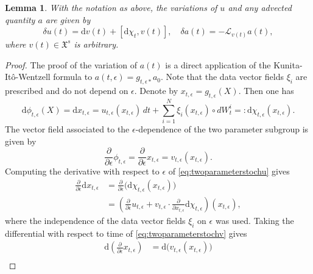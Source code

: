 \documentclass[11pt, oneside]{article}   	%
\numberwithin{equation}{section}
\theoremstyle{plain}
\newtheorem{lemma}[theorem]{Lemma}
\theoremstyle{definition}
\theoremstyle{remark}
\newcommand{\<}{\langle}
\renewcommand{\>}{\rangle}
\def\rmd{{\mathrm{d}}}
\begin{document}
\begin{lemma}
With the notation as above, the variations of $u$ and any advected quantity $a$ are given by 
\begin{equation}
\delta u(t) = {\rmd}v(t) + [{\rmd}\chi_t,v(t)],\quad \delta a(t) = -\mathcal{L}_{v(t)}a(t),
\label{def:delta-var}
\end{equation}
where $v(t)\in\mathfrak{X}^s$ is arbitrary.
 
\end{lemma}
\begin{proof}
The proof of the variation of $a(t)$ is a direct application of the Kunita-It\^o-Wentzell formula to $a(t,\epsilon)=g_{t,\epsilon*}a_0$. Note that the data vector fields $\xi_i$ are prescribed and do not depend on $\epsilon$. Denote by $x_{t,\epsilon} = g_{t,\epsilon}(X)$. Then one has
\begin{equation}
{\rmd}\phi_{t,\epsilon}(X) = {\rmd}x_{t,\epsilon} = u_{t,\epsilon}(x_{t,\epsilon})\,dt + \sum_{i=1}^N \xi_i(x_{t,\epsilon})\circ dW_t^i =: {\rmd}\chi_{t,\epsilon}(x_{t,\epsilon}).
\label{eq:twoparameterstochu}
\end{equation}
The vector field associated to the $\epsilon$-dependence of the two parameter subgroup is given by
\begin{equation}
\frac{\partial}{\partial \epsilon}\phi_{t,\epsilon} = \frac{\partial}{\partial \epsilon}x_{t,\epsilon} = v_{t,\epsilon}(x_{t,\epsilon}).
\label{eq:twoparameterstochv}
\end{equation}
Computing the derivative with respect to $\epsilon$ of \eqref{eq:twoparameterstochu} gives
\begin{equation}
\begin{aligned}
\frac{\partial}{\partial \epsilon}{\rmd}x_{t,\epsilon} &= \frac{\partial}{\partial \epsilon}\big({\rmd}\chi_{t,\epsilon}(x_{t,\epsilon})\big)\\
&= \left(\frac{\partial}{\partial \epsilon}u_{t,\epsilon} + v_{t,\epsilon}\cdot\frac{\partial}{\partial x_{t,\epsilon}}{\rmd}\chi_{t,\epsilon}\right)(x_{t,\epsilon}),
\end{aligned}
\end{equation}
where the independence of the data vector fields $\xi_i$ on $\epsilon$ was used. Taking the differential with respect to time of \eqref{eq:twoparameterstochv} gives
\begin{equation}
\begin{aligned}
{\rmd}\left(\frac{\partial}{\partial \epsilon} x_{t,\epsilon}\right) &= {\rmd}\big(v_{t,\epsilon}(x_{t,\epsilon})\big)\\

\end{aligned}
\end{equation}
\end{proof}
\end{document}

